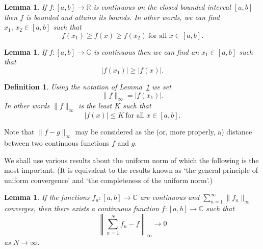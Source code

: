 \documentclass[12pt]{article}
\newtheorem{lemma}[theorem]{Lemma}
\newtheorem{definition}[theorem]{Definition}
\theoremstyle{definition}
\begin{document}
\begin{lemma} If $f:[a,b]\rightarrow{\mathbb R}$ is continuous
on the closed bounded interval $[a,b]$ then $f$
is bounded and attains its bounds. In other words,
we can find $x_{1},\,x_{2}\in[a,b]$ such that
\[f(x_{1})\geq f(x)\geq f(x_{2})
\ \text{for all $x\in[a,b]$}.\]
\end{lemma}
\begin{lemma}\label{L, before uniform norm}
If $f:[a,b]\rightarrow{\mathbb C}$ is continuous
then we can find an $x_{1}\in[a,b]$ such that
\[|f(x_{1})|\geq |f(x)|.\]
\end{lemma}
\begin{definition}\label{D, uniform norm} Using the notation
of Lemma~\ref{L, before uniform norm} we set
\[\|f\|_{\infty}=|f(x_{1})|.\]
In other words $\|f\|_{\infty}$ is the least $K$ such that
\[|f(x)|\leq K\ \text{for all $x\in[a,b]$}.\]
\end{definition}
Note that $\|f-g\|_{\infty}$ may be considered as the
(or, more properly, a) distance between two continuous functions
$f$ and $g$.

We shall use various results about the uniform
norm of which the following is the most important.
(It is equivalent to the results known as `the general principle
of uniform convergence' and `the completeness of the uniform norm'.)
\begin{lemma} If the functions
$f_{n}:[a,b]\rightarrow{\mathbb C}$ are continuous
and $\sum_{n=1}^{\infty}\|f_{n}\|_{\infty}$
converges, then there exists a continuous function
$f:[a,b]\rightarrow{\mathbb C}$ such that
\[\left\|\sum_{n=1}^{N}f_{n}-f\right\|_{\infty}\rightarrow 0\]
as $N\rightarrow\infty$.
\end{lemma}
\end{document}
